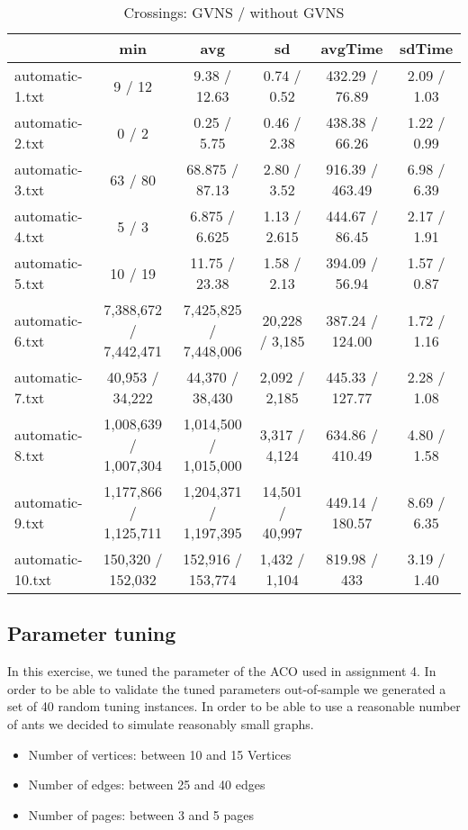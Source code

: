 \documentclass{scrartcl}
\begin{document}
\begin{table}
\scriptsize
\begin{tabular}{lccccc}
  \toprule  & min & avg & sd & avgTime & sdTime \\ 
  \midrule automatic-1.txt & 9 / 12 & 9.38 / 12.63 & 0.74 / 0.52 & 432.29 / 76.89 & 2.09 / 1.03 \\ 
  automatic-2.txt & 0 / 2 & 0.25 / 5.75  & 0.46 / 2.38 & 438.38 / 66.26 & 1.22 / 0.99 \\ 
  automatic-3.txt & 63 / 80 & 68.875 / 87.13 & 2.80 / 3.52 & 916.39 / 463.49 & 6.98 / 6.39 \\ 
  automatic-4.txt & 5 / 3 & 6.875 / 6.625 & 1.13 / 2.615 & 444.67 / 86.45 & 2.17 / 1.91 \\ 
  automatic-5.txt & 10 / 19 & 11.75 / 23.38 & 1.58 / 2.13 & 394.09 / 56.94 & 1.57 / 0.87 \\ 
  automatic-6.txt & 7,388,672 / 7,442,471 & 7,425,825 / 7,448,006 & 20,228 / 3,185 & 387.24 / 124.00 & 1.72 / 1.16 \\ 
  automatic-7.txt & 40,953 / 34,222 & 44,370 / 38,430 & 2,092 / 2,185 & 445.33 / 127.77 & 2.28 / 1.08 \\ 
  automatic-8.txt & 1,008,639 / 1,007,304 & 1,014,500 / 1,015,000  & 3,317 / 4,124 & 634.86 / 410.49 & 4.80 / 1.58 \\ 
  automatic-9.txt & 1,177,866 / 1,125,711 & 1,204,371 / 1,197,395 & 14,501 / 40,997 & 449.14 / 180.57 & 8.69 / 6.35 \\ 
  automatic-10.txt & 150,320 / 152,032 & 152,916 / 153,774 & 1,432 / 1,104 & 819.98 / 433 & 3.19 / 1.40 \\ 
  \bottomrule 
\end{tabular}
\caption{Crossings: GVNS / without GVNS}
\label{tab:results}
\end{table}

\subsection{Parameter tuning}
In this exercise, we tuned the parameter of the ACO used in assignment 4. In order to be able to validate
the tuned parameters out-of-sample we generated a set of 40 random tuning instances. In order to be able to use
a reasonable number of ants we decided to simulate reasonably small graphs. 

\begin{itemize}
  \item Number of vertices: between 10 and 15 Vertices
  \item Number of edges: between 25 and 40 edges
  \item Number of pages: between 3 and 5 pages
\end{itemize}
\end{document}
